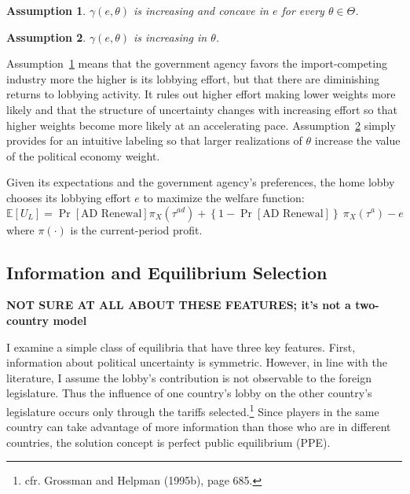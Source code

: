 \documentclass[10pt]{article}
\newtheorem{assumption}{Assumption}
\newcommand{\ta}{\theta}
\newcommand{\expect}{\mathbb{E}}
\newcommand{\ga}{\gamma}
\begin{document}
\begin{assumption}
  $\ga(e,\ta)$ is increasing and concave in $e$ for every $\ta \in \Theta$.
  \label{as:ga_c}
\end{assumption}

\begin{assumption}
  $\ga(e,\ta)$ is increasing in $\ta$.
  \label{as:ga_ta}
\end{assumption}

Assumption~\ref{as:ga_c} means that the government agency favors the import-competing industry more the higher is its lobbying effort, but that there are diminishing returns to lobbying activity. It rules out higher effort making lower weights more likely and that the structure of uncertainty changes with increasing effort so that higher weights become more likely at an accelerating pace. Assumption~\ref{as:ga_ta} simply provides for an intuitive labeling so that larger realizations of $\ta$ increase the value of the political economy weight.

Given its expectations and the government agency's preferences, the home lobby chooses its lobbying effort $e$ to maximize the welfare function:
\begin{equation}
  \expect \left[U_L \right] = \Pr\left[ \text{AD Renewal} \right]  \pi_X(\tau^{\mathit{ad}}) +\left\{1-\Pr\left[ \text{AD Renewal}\right]\right\} \ \pi_X(\tau^a) - e
  \label{eq:lv}
\end{equation}
where $\pi(\cdot)$ is the current-period profit. 


\subsection{Information and Equilibrium Selection}
\label{sec:info}

\textbf{NOT SURE AT ALL ABOUT THESE FEATURES; it's not a two-country model}

I examine a simple class of equilibria that have three key features. First, information about political uncertainty is symmetric. However, in line with the literature, I assume the lobby's contribution is not observable to the foreign legislature. Thus the influence of one country's lobby on the other country's legislature occurs only through the tariffs selected.\footnote{cfr. Grossman and Helpman (1995b), page 685.} Since players in the same country can take advantage of more information than those who are in different countries, the solution concept is perfect public equilibrium (PPE).
\end{document}
